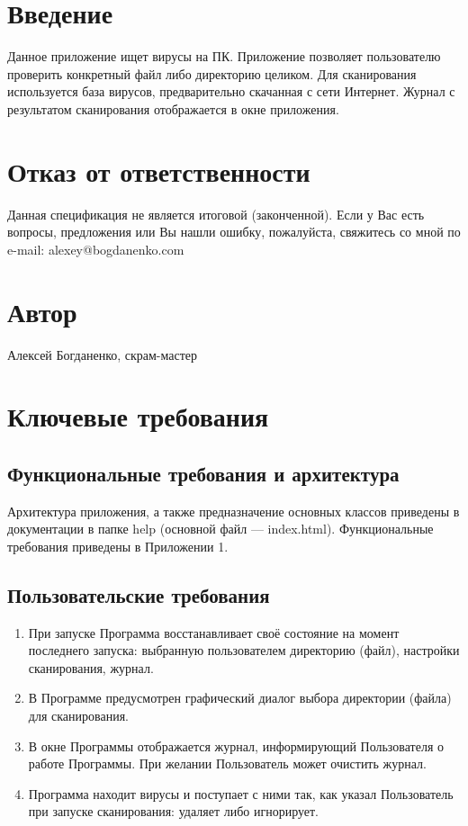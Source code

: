 \section{Введение}
Данное приложение ищет вирусы на ПК. Приложение позволяет пользователю проверить конкретный файл либо директорию целиком. Для сканирования используется база вирусов, предварительно скачанная с сети Интернет. Журнал с результатом сканирования отображается в окне приложения.
\section{Отказ от ответственности}
Данная спецификация не является итоговой (законченной). Если у Вас есть вопросы, предложения или Вы нашли ошибку, пожалуйста, свяжитесь со мной по e-mail: alexey@bogdanenko.com
\section{Автор}
Алексей Богданенко, скрам-мастер
\section{Ключевые требования}
\subsection{Функциональные требования и архитектура}
Архитектура приложения, а также предназначение основных классов приведены в документации в папке help (основной файл — index.html). Функциональные требования приведены в Приложении 1.
\subsection{Пользовательские требования}
\begin{enumerate}
\item При запуске Программа восстанавливает своё состояние на момент последнего запуска: выбранную пользователем директорию (файл), настройки сканирования, журнал.
\item В Программе предусмотрен графический диалог выбора директории (файла) для сканирования.
\item В окне Программы отображается журнал, информирующий Пользователя о работе Программы. При желании Пользователь может очистить журнал.
\item Программа находит вирусы и поступает с ними так, как указал Пользователь при запуске сканирования: удаляет либо игнорирует.
\end{enumerate}
